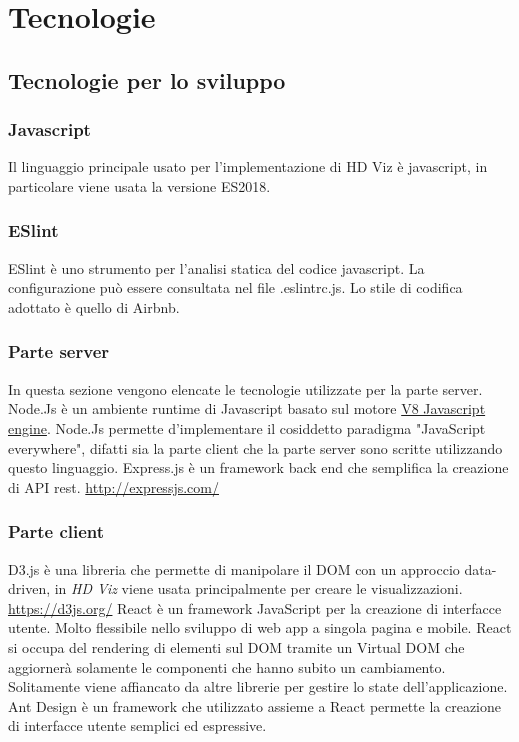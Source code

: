 \section{Tecnologie}
    \subsection{Tecnologie per lo sviluppo}
    \subsubsection{Javascript}
        Il linguaggio principale usato per l'implementazione di HD Viz è javascript, in particolare viene usata la versione ES2018.
    \subsubsection{ESlint}
        ESlint è uno strumento per l'analisi statica del codice javascript. La configurazione può essere consultata nel file .eslintrc.js. Lo stile di codifica adottato è quello di Airbnb.
    \subsubsection{Parte server}
    In questa sezione vengono elencate le tecnologie utilizzate per la parte server.
        Node.Js è un ambiente runtime di Javascript basato sul motore \href{https://v8.dev/}{V8 Javascript engine}. Node.Js permette d'implementare il cosiddetto paradigma "JavaScript everywhere", difatti sia la parte client che la parte server sono scritte utilizzando questo linguaggio.
        Express.js è un framework back end che semplifica la creazione di API rest.
        \url{http://expressjs.com/}
    \subsubsection{Parte client}
        D3.js è una libreria che permette di manipolare il DOM con un approccio data-driven, in \textit{HD Viz} viene usata principalmente per creare le visualizzazioni.
        \url{https://d3js.org/}
        React è un framework JavaScript per la creazione di interfacce utente. Molto flessibile nello sviluppo di web app a singola pagina e mobile. React si occupa del rendering di elementi sul DOM tramite un Virtual DOM che aggiornerà  solamente le componenti che hanno subito un cambiamento. Solitamente viene affiancato da altre librerie per gestire lo state dell'applicazione.
        Ant Design è un framework che utilizzato assieme a React permette la creazione di interfacce utente semplici ed espressive.
